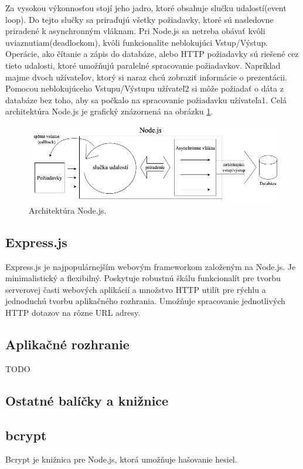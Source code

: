 Za vysokou výkonnosťou stojí jeho jadro, ktoré obsahuje slučku udalostí(event loop). Do tejto slučky sa priraďujú všetky požiadavky, ktoré sú nasledovne priradené k asynchronným vláknam. Pri Node.js sa netreba obávať kvôli uviaznutiam(deadlockom), kvôli funkcionalite neblokujúci Vstup/Výstup. Operácie, ako čítanie a zápis do databáze, alebo HTTP požiadavky sú riešené cez tieto udalosti, ktoré umožňujú paralelné spracovanie požiadavkov. Napríklad majme dvoch užívateľov, ktorý si naraz chcú zobraziť informácie o prezentácii. Pomocou neblokujúceho Vstupu/Výstupu užívateľ2 si môže požiadať o dáta z databáze bez toho, aby sa počkalo na spracovanie požiadavku užívateľa1. Celá architektúra Node.js je grafický znázornená na obrázku \ref{pic:nodejs}.

    \begin{figure}[!hbt]
        \centering
        \includegraphics[scale=0.5]{obrazky/nodejs.png}
        \caption{Architektúra Node.js.}
        \label{pic:nodejs}
    \end{figure}
    
\subsection*{Express.js}
Express.js\cite{expressjs} je najpopulárnejším webovým frameworkom založeným na Node.js. Je minimalistický a flexibilný. Poskytuje robustnú škálu funkcionalít pre tvorbu serverovej časti webových aplikácií a množstvo HTTP utilít pre rýchlu a jednoduchú tvorbu aplikačného rozhrania. Umožňuje spracovanie jednotlivých HTTP dotazov na rôzne URL adresy.

\subsection{Aplikačné rozhranie}
TODO

\subsection{Ostatné balíčky a knižnice}
\subsection*{bcrypt}
Bcrypt je knižnica pre Node.js, ktorá umožňuje hašovanie hesiel.

